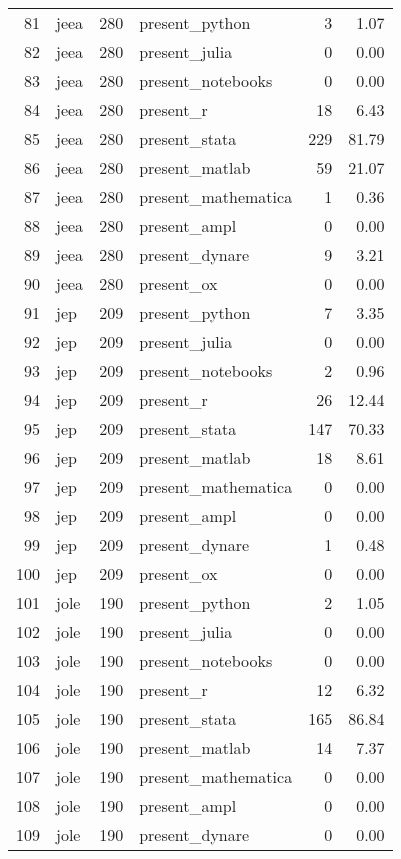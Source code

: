 \begin{table}[ht]
\begin{tabular}{rlrlrr}
  81 & jeea & 280 & present\_python &   3 & 1.07 \\ 
  82 & jeea & 280 & present\_julia &   0 & 0.00 \\ 
  83 & jeea & 280 & present\_notebooks &   0 & 0.00 \\ 
  84 & jeea & 280 & present\_r &  18 & 6.43 \\ 
  85 & jeea & 280 & present\_stata & 229 & 81.79 \\ 
  86 & jeea & 280 & present\_matlab &  59 & 21.07 \\ 
  87 & jeea & 280 & present\_mathematica &   1 & 0.36 \\ 
  88 & jeea & 280 & present\_ampl &   0 & 0.00 \\ 
  89 & jeea & 280 & present\_dynare &   9 & 3.21 \\ 
  90 & jeea & 280 & present\_ox &   0 & 0.00 \\ 
  91 & jep & 209 & present\_python &   7 & 3.35 \\ 
  92 & jep & 209 & present\_julia &   0 & 0.00 \\ 
  93 & jep & 209 & present\_notebooks &   2 & 0.96 \\ 
  94 & jep & 209 & present\_r &  26 & 12.44 \\ 
  95 & jep & 209 & present\_stata & 147 & 70.33 \\ 
  96 & jep & 209 & present\_matlab &  18 & 8.61 \\ 
  97 & jep & 209 & present\_mathematica &   0 & 0.00 \\ 
  98 & jep & 209 & present\_ampl &   0 & 0.00 \\ 
  99 & jep & 209 & present\_dynare &   1 & 0.48 \\ 
  100 & jep & 209 & present\_ox &   0 & 0.00 \\ 
  101 & jole & 190 & present\_python &   2 & 1.05 \\ 
  102 & jole & 190 & present\_julia &   0 & 0.00 \\ 
  103 & jole & 190 & present\_notebooks &   0 & 0.00 \\ 
  104 & jole & 190 & present\_r &  12 & 6.32 \\ 
  105 & jole & 190 & present\_stata & 165 & 86.84 \\ 
  106 & jole & 190 & present\_matlab &  14 & 7.37 \\ 
  107 & jole & 190 & present\_mathematica &   0 & 0.00 \\ 
  108 & jole & 190 & present\_ampl &   0 & 0.00 \\ 
  109 & jole & 190 & present\_dynare &   0 & 0.00 \\ 

\end{tabular}
\end{table}
